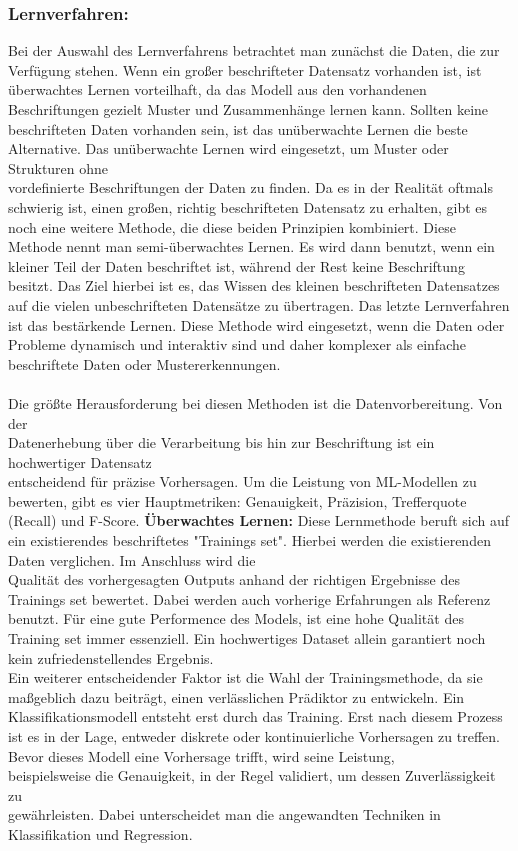 \subsubsection*{Lernverfahren:}
Bei der Auswahl des Lernverfahrens betrachtet man zunächst die Daten, die zur Verfügung stehen. Wenn ein großer beschrifteter Datensatz vorhanden ist, ist überwachtes Lernen vorteilhaft, da das Modell aus den vorhandenen Beschriftungen gezielt Muster und Zusammenhänge lernen kann. Sollten keine beschrifteten Daten vorhanden sein, ist das unüberwachte Lernen die beste Alternative. Das unüberwachte Lernen wird eingesetzt, um Muster oder Strukturen ohne \\ vordefinierte Beschriftungen der Daten zu finden.
Da es in der Realität oftmals schwierig ist, einen großen, richtig beschrifteten Datensatz zu erhalten, gibt es noch eine weitere Methode, die diese beiden Prinzipien kombiniert. Diese Methode nennt man semi-überwachtes Lernen. Es wird dann benutzt, wenn ein kleiner Teil der Daten beschriftet ist, während der Rest keine Beschriftung besitzt. Das Ziel hierbei ist es, das Wissen des kleinen beschrifteten Datensatzes auf die vielen unbeschrifteten Datensätze zu übertragen.
Das letzte Lernverfahren ist das bestärkende Lernen. Diese Methode wird eingesetzt, wenn die Daten oder Probleme dynamisch und interaktiv sind und daher komplexer als einfache beschriftete Daten oder Mustererkennungen\cite{Lernen}.
 \\ \\
Die größte Herausforderung bei diesen Methoden ist die Datenvorbereitung. Von der \\ Datenerhebung über die Verarbeitung bis hin zur Beschriftung ist ein hochwertiger Datensatz \\ entscheidend für präzise Vorhersagen\cite{Preprocessing}. Um die Leistung von ML-Modellen zu bewerten, gibt es vier Hauptmetriken: Genauigkeit, Präzision, Trefferquote (Recall) und F-Score\cite{Fallbeispiel}.
\nAbsatz
\textbf{Überwachtes Lernen: } Diese Lernmethode beruft sich auf ein existierendes beschriftetes "Trainings set". Hierbei werden die existierenden Daten verglichen. Im Anschluss wird die \\ Qualität des vorhergesagten Outputs anhand der richtigen Ergebnisse des Trainings set bewertet. Dabei werden auch vorherige Erfahrungen als Referenz benutzt. Für eine gute Performence des Models, ist eine hohe Qualität des Training set immer essenziell.  
Ein hochwertiges Dataset allein garantiert noch kein zufriedenstellendes Ergebnis. \\ Ein weiterer entscheidender Faktor ist die Wahl der Trainingsmethode, da sie maßgeblich dazu beiträgt, einen verlässlichen Prädiktor zu entwickeln. Ein Klassifikationsmodell entsteht erst durch das Training. Erst nach diesem Prozess ist es in der Lage, entweder diskrete oder kontinuierliche Vorhersagen zu treffen. Bevor dieses Modell eine Vorhersage trifft, wird seine Leistung, \\ beispielsweise die Genauigkeit, in der Regel validiert, um dessen Zuverlässigkeit zu \\ gewährleisten. Dabei unterscheidet man die angewandten Techniken in Klassifikation und Regression\cite{Lernen}. 
